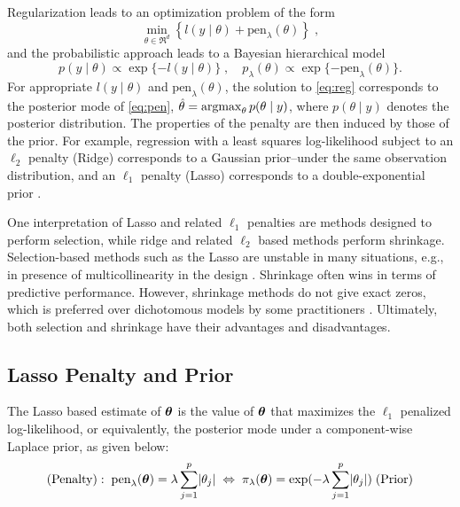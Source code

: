 \documentclass[11pt]{article}
\begin{document}
Regularization leads to an optimization problem of the form 
\begin{equation}
  \min_{\theta \in \Re^d}
  \left\{
    l(y \mid \theta) + \text{pen}_{\lambda}(\theta) 
  \right\}
  \;, 
  \label{eq:reg}
\end{equation}
and the probabilistic approach leads to a Bayesian hierarchical model
\begin{equation}
  p(y \mid \theta) \propto \exp\{-l(y \mid \theta)\} \; , \quad p_{\lambda}(\theta)
  \propto \exp\{ -\text{pen}_{\lambda}(\theta) \}. 
  \label{eq:pen}
\end{equation}
For appropriate $l(y \mid \theta)$ and $\text{pen}_{\lambda}(\theta)$, the solution to \eqref{eq:reg} corresponds to the posterior mode of \eqref{eq:pen}, $\hat{\theta} = \argmax_\theta p(\theta \mid y)$, where $p(\theta \mid y)$ denotes the posterior distribution. The properties of the penalty are then induced by those of the prior.  For example, regression with a least squares log-likelihood subject to an $\ell_2$ penalty (Ridge) corresponds to a \citep{hoerl70} Gaussian prior--under the same observation distribution, and 
an $\ell_1$ penalty (Lasso) \citep{tibshirani96} corresponds to a
double-exponential prior \citep{park_bayesian_2008}.

One interpretation of Lasso and related $\ell_1$ penalties are methods designed
to perform selection, while ridge and related $\ell_2$ based methods perform
shrinkage. Selection-based methods such as the Lasso are unstable in many
situations, e.g., in presence of multicollinearity in the design \citep[ch.3]{hastie_elements_2009}. Shrinkage
often wins in terms of predictive performance. However, shrinkage methods do not
give exact zeros, which is preferred over dichotomous models by some
practitioners \citep{stephens2009bayesian}.  Ultimately, both selection and shrinkage
have their advantages and disadvantages. 

\subsection{Lasso Penalty and Prior}\label{sec:lasso}

The Lasso based estimate of $\boldsymbol{\theta}$ is the value of $\boldsymbol{\theta}$ that maximizes the $\ell_1$ penalized log-likelihood, or equivalently, the posterior mode under a component-wise Laplace prior, as given below: 
\begin{equation}
  (\text{Penalty}): \; \text{pen}_{\lambda}(\boldsymbol{\theta}) = \lambda \sum_{j = 1}^{p}  \lvert\theta_j\rvert \; \Leftrightarrow \; \pi_{\lambda}(\boldsymbol{\theta}) = \exp( - \lambda \sum_{j =
  1}^{p} \lvert\theta_j\rvert) \; (\text{Prior})
\end{equation}
\end{document}
